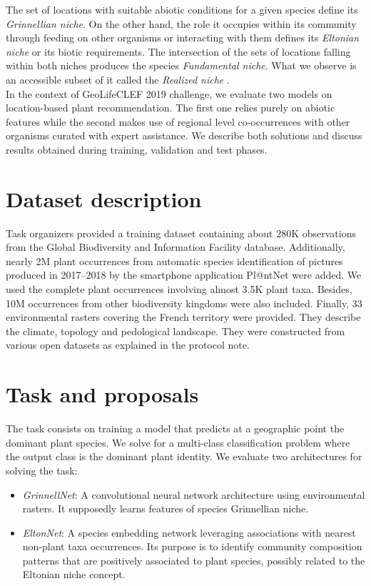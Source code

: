 \documentclass[]{article}
\begin{document}
\noindent The set of locations with suitable abiotic conditions for a given species define its \textit{Grinnellian niche}\cite{grinnell1917niche}. On the other hand, the role it occupies within its community through feeding on other organisms or interacting with them defines its \textit{Eltonian niche}\cite{elton2001animal} or its biotic requirements. The intersection of the sets of locations falling within both niches produces the species \textit{Fundamental niche}. What we observe is an accessible subset of it called the \textit{Realized niche} \cite{peterson2011ecological}. \\
 
\noindent In the context of GeoLifeCLEF 2019 challenge, we evaluate two models on location-based plant recommendation. The first one relies purely on abiotic features while the second makes use of regional level co-occurrences with other organisms curated with expert assistance. We describe both solutions and discuss results obtained during training, validation and test phases.  %


\section{Dataset description}
Task organizers provided a training dataset containing about 280K observations from the Global Biodiversity and Information Facility database. Additionally, nearly 2M plant occurrences from automatic species identification of pictures produced in 2017--2018 by the smartphone application Pl@ntNet were added. We used the complete plant occurrences involving almost 3.5K plant taxa. Besides, 10M occurrences from other biodiversity kingdoms were also included. Finally, 33 environmental rasters covering the French territory were provided. They describe the climate, topology and pedological landscape. They were constructed from various open datasets as explained in the protocol note. %


\section{Task and proposals}
The task consists on training a model that predicts at a geographic point the dominant plant species. We solve for a multi-class classification problem where the output class is the dominant plant identity. We evaluate two architectures for solving the task:
\begin{itemize}
	\item \textit{GrinnellNet}: A convolutional neural network architecture using environmental rasters. It supposedly learns features of species Grinnellian niche.
	\item \textit{EltonNet}: A species embedding network leveraging associations with nearest non-plant taxa occurrences. Its purpose is to identify community composition patterns that are positively associated to plant species, possibly related to the Eltonian niche concept.
\end{itemize}
\end{document}

